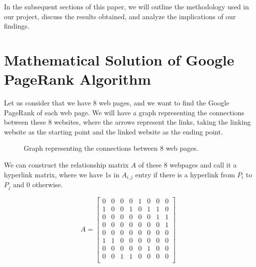 \documentclass{article}
\begin{document}
In the subsequent sections of this paper, we will outline the methodology used in our project, discuss the results obtained, and analyze the implications of our findings.

\section{Mathematical Solution of Google PageRank Algorithm}

Let us consider that we have 8 web pages, and we want to find the Google PageRank of each web page. We will have a graph representing the connections between these 8 websites, where the arrows represent the links, taking the linking website as the starting point and the linked website as the ending point.

\begin{figure}[htbp]
    \centering
    \caption{Graph representing the connections between 8 web pages.}
    \label{fig:web_graph}
\end{figure}

We can construct the relationship matrix \( A \) of these 8 webpages and call it a hyperlink matrix, where we have 1s in \( A_{i,j} \) entry if there is a hyperlink from \( P_i \) to \( P_j \) and 0 otherwise.

\[ A = \begin{bmatrix}
0 & 0 & 0 & 0 & 1 & 0 & 0 & 0 \\
1 & 0 & 0 & 1 & 0 & 1 & 1 & 0 \\
0 & 0 & 0 & 0 & 0 & 0 & 1 & 1 \\
0 & 0 & 0 & 0 & 0 & 0 & 0 & 1 \\
0 & 0 & 0 & 0 & 0 & 0 & 0 & 0 \\
1 & 1 & 0 & 0 & 0 & 0 & 0 & 0 \\
0 & 0 & 0 & 0 & 0 & 1 & 0 & 0 \\
0 & 0 & 1 & 1 & 0 & 0 & 0 & 0 \\
\end{bmatrix} \]
\end{document}

